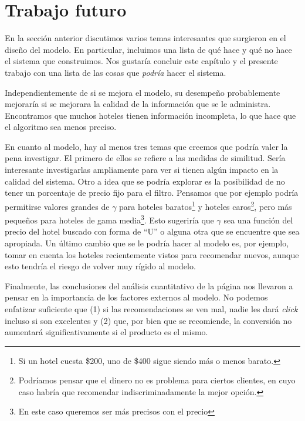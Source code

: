 \documentclass[12pt]{report}
\begin{document}
\section{Trabajo futuro}

En la sección anterior discutimos varios temas interesantes que surgieron en el diseño del modelo. En particular, incluimos una lista de qué hace y qué no hace el sistema que construimos. Nos gustaría concluir este capítulo y el presente trabajo con una lista de las cosas que \emph{podría} hacer el sistema.

Independientemente de si se mejora el modelo, su desempeño probablemente mejoraría si se mejorara la calidad de la información que se le administra. Encontramos que muchos hoteles tienen información incompleta, lo que hace que el algoritmo sea menos preciso.

En cuanto al modelo, hay al menos tres temas que creemos que podría valer la pena investigar. El primero de ellos se refiere a las medidas de similitud. Sería interesante investigarlas ampliamente para ver si tienen algún impacto en la calidad del sistema. Otro a idea que se podría explorar es la posibilidad de no tener un porcentaje de precio fijo para el filtro. Pensamos que por ejemplo podría permitirse valores grandes de $\gamma$ para hoteles baratos\footnote{Si un hotel cuesta \$200, uno de \$400 sigue siendo más o menos barato.} y hoteles caros\footnote{Podríamos pensar que el dinero no es problema para ciertos clientes, en cuyo caso habría que recomendar indiscriminadamente la mejor opción.}, pero más pequeños para hoteles de gama media\footnote{En este caso queremos ser más precisos con el precio}. Esto sugeriría que $\gamma$ sea una función del precio del hotel buscado con forma de ``U'' o alguna otra que se encuentre que sea apropiada. Un último cambio que se le podría hacer al modelo es, por ejemplo, tomar en cuenta los hoteles recientemente vistos para recomendar nuevos, aunque esto tendría el riesgo de volver muy rígido al modelo.

Finalmente, las conclusiones del análisis cuantitativo de la página nos llevaron a pensar en la importancia de los factores externos al modelo. No podemos enfatizar suficiente que (1) si las recomendaciones se ven mal, nadie les dará \emph{click} incluso si son excelentes y (2) que, por bien que se recomiende, la conversión no aumentará significativamente si el producto es el mismo.










%
\end{document}
